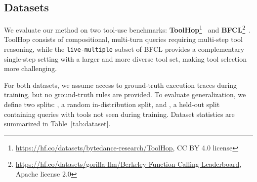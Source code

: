\subsection{Datasets}

We evaluate our method on two tool-use benchmarks: \textbf{ToolHop}\footnote{\url{https://hf.co/datasets/bytedance-research/ToolHop}, CC BY 4.0 license}~\cite{ye2025toolhop} and
\textbf{BFCL}\footnote{\url{https://hf.co/datasets/gorilla-llm/Berkeley-Function-Calling-Leaderboard}, Apache license 2.0}~\cite{berkeley-function-calling-leaderboard}. ToolHop consists of compositional,
multi-turn queries requiring multi-step tool reasoning, while the \texttt{live-multiple}
subset of BFCL provides a complementary single-step setting with a larger and more diverse
tool set, making tool selection more challenging.

For both datasets, we assume access to ground-truth execution traces during training, but no
ground-truth rules are provided. To evaluate generalization, we define two splits:
\textbf{\rand}, a random in-distribution split, and \textbf{\unseen}, a held-out split
containing queries with tools not seen during training. Dataset statistics are summarized
in Table~\ref{tab:dataset}.




